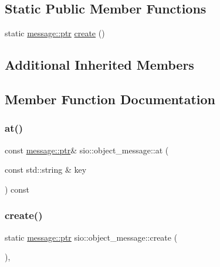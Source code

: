 \subsection*{Static Public Member Functions}
\begin{DoxyCompactItemize}
\item 
static \hyperlink{classsio_1_1message_a6340b6fef57e4516eb17928b1885a615}{message\+::ptr} \hyperlink{classsio_1_1object__message_ab100c2e474a1c17bfd93009076cdb6a8}{create} ()
\end{DoxyCompactItemize}
\subsection*{Additional Inherited Members}


\subsection{Member Function Documentation}
\mbox{\label{classsio_1_1object__message_ac2ca0303720d11347e7de69592db9999}} 
\subsubsection{\texorpdfstring{at()}{at()}}
{\footnotesize\ttfamily const \hyperlink{classsio_1_1message_a6340b6fef57e4516eb17928b1885a615}{message\+::ptr}\& sio\+::object\+\_\+message\+::at (\begin{DoxyParamCaption}\item[{const std\+::string \&}]{key }\end{DoxyParamCaption}) const\hspace{0.3cm}{\ttfamily [inline]}}

\mbox{\label{classsio_1_1object__message_ab100c2e474a1c17bfd93009076cdb6a8}} 
\subsubsection{\texorpdfstring{create()}{create()}}
{\footnotesize\ttfamily static \hyperlink{classsio_1_1message_a6340b6fef57e4516eb17928b1885a615}{message\+::ptr} sio\+::object\+\_\+message\+::create (\begin{DoxyParamCaption}{ }\end{DoxyParamCaption})\hspace{0.3cm}{\ttfamily [inline]}, {\ttfamily [static]}}

